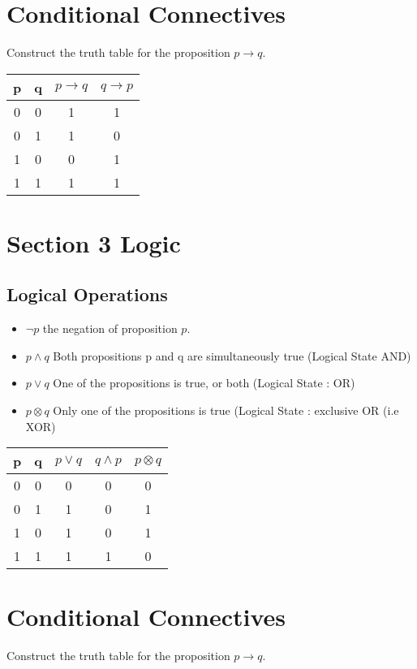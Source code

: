 \documentclass[12pt]{article}
\begin{document}
\section{Conditional Connectives}
Construct the truth table for the proposition $p \rightarrow q$.

\begin{center}
\begin{tabular}{|c|c|c|c|}
\hline
p & q & $p \rightarrow q$ & $q \rightarrow p$ \\
\hline
0 & 0 & 1& 1 \\
0 & 1 & 1 & 0 \\
1 & 0 & 0 & 1 \\
1 & 1 & 1 & 1 \\
\hline
\end{tabular}
\end{center}


\section{Section 3 Logic}
\subsection{Logical Operations}
\begin{itemize}
\item $\neg p$ the negation of proposition $p$.
\item $p \wedge q$ Both propositions p and q are simultaneously true (Logical State AND)
\item $p \vee q $ One of the propositions is true, or both (Logical State : OR)
\item $p \otimes q$ Only one of the propositions is true (Logical State : exclusive OR (i.e XOR)
\end{itemize}
\begin{center}
\begin{tabular}{|c|c|c|c|c|}
\hline
p & q & $p \vee q$ & $q \wedge p$ & $p \otimes q$ \\
\hline
0 & 0 & 0 & 0 & 0 \\
0 & 1 & 1 & 0 & 1\\
1 & 0 & 1 & 0 & 1 \\
1 & 1 & 1 & 1 & 0\\
\hline
\end{tabular}
\end{center}
\section{Conditional Connectives}
Construct the truth table for the proposition $p \rightarrow q$.
\end{document}
